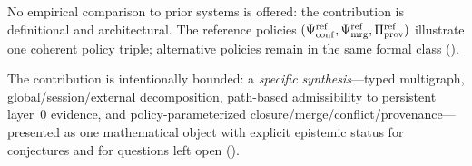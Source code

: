 No empirical comparison to prior systems is offered: the contribution is definitional and architectural.
The reference policies $(\Psi_{\mathrm{conf}}^{\mathrm{ref}},\Psi_{\mathrm{mrg}}^{\mathrm{ref}},\Pi_{\mathrm{prov}}^{\mathrm{ref}})$ illustrate one coherent policy triple; alternative policies remain in the same formal class ().

The contribution is intentionally bounded: a \emph{specific synthesis}---typed multigraph, global/session/external decomposition, path-based admissibility to persistent layer~$0$ evidence, and policy-parameterized closure/merge/conflict/provenance---presented as one mathematical object with explicit epistemic status for conjectures and for questions left open ().

